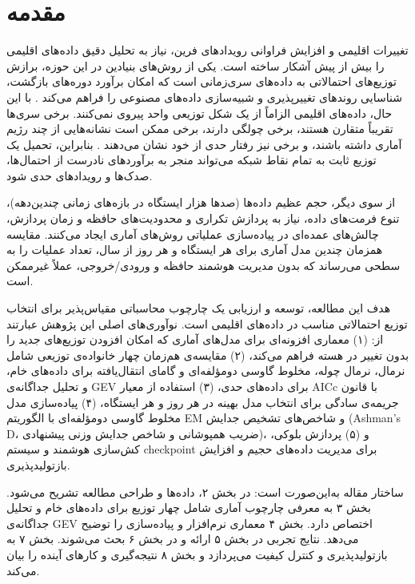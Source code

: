 \documentclass[12pt,a4paper,twocolumn]{article}
\begin{document}
\section{مقدمه}

تغییرات اقلیمی و افزایش فراوانی رویدادهای فرین، نیاز به تحلیل دقیق داده‌های اقلیمی را بیش از پیش آشکار ساخته است. یکی از روش‌های بنیادین در این حوزه، برازش توزیع‌های احتمالاتی به داده‌های سری‌زمانی است که امکان برآورد دوره‌های بازگشت، شناسایی روندهای تغییرپذیری و شبیه‌سازی داده‌های مصنوعی را فراهم می‌کند \cite{wilks2011}. با این حال، داده‌های اقلیمی الزاماً از یک شکل توزیعی واحد پیروی نمی‌کنند. برخی سری‌ها تقریباً متقارن هستند، برخی چولگی دارند، برخی ممکن است نشانه‌هایی از چند رژیم آماری داشته باشند، و برخی نیز رفتار حدی از خود نشان می‌دهند \cite{katz2002}. بنابراین، تحمیل یک توزیع ثابت به تمام نقاط شبکه می‌تواند منجر به برآوردهای نادرست از احتمال‌ها، صدک‌ها و رویدادهای حدی شود.

از سوی دیگر، حجم عظیم داده‌ها (صدها هزار ایستگاه در بازه‌های زمانی چندین‌دهه)، تنوع فرمت‌های داده، نیاز به پردازش تکراری و محدودیت‌های حافظه و زمان پردازش، چالش‌های عمده‌ای در پیاده‌سازی عملیاتی روش‌های آماری ایجاد می‌کنند. مقایسه همزمان چندین مدل آماری برای هر ایستگاه و هر روز از سال، تعداد عملیات را به سطحی می‌رساند که بدون مدیریت هوشمند حافظه و ورودی/خروجی، عملاً غیرممکن است.

هدف این مطالعه، توسعه و ارزیابی یک چارچوب محاسباتی مقیاس‌پذیر برای انتخاب توزیع احتمالاتی مناسب در داده‌های اقلیمی است. نوآوری‌های اصلی این پژوهش عبارتند از: (۱) معماری افزونه‌ای برای مدل‌های آماری که امکان افزودن توزیع‌های جدید را بدون تغییر در هسته فراهم می‌کند، (۲) مقایسه‌ی هم‌زمان چهار خانواده‌ی توزیعی شامل نرمال، نرمال چوله، مخلوط گاوسی دومؤلفه‌ای و گامای انتقال‌یافته برای داده‌های خام، و تحلیل جداگانه‌ی GEV برای داده‌های حدی، (۳) استفاده از معیار AICc با قانون جریمه‌ی سادگی برای انتخاب مدل بهینه در هر روز و هر ایستگاه، (۴) پیاده‌سازی مدل مخلوط گاوسی دومؤلفه‌ای با الگوریتم EM و شاخص‌های تشخیص جدایش (Ashman's D، ضریب همپوشانی و شاخص جدایش وزنی پیشنهادی)، و (۵) پردازش بلوکی، کش‌سازی هوشمند و سیستم checkpoint برای مدیریت داده‌های حجیم و افزایش بازتولیدپذیری.

ساختار مقاله به‌این‌صورت است: در بخش ۲، داده‌ها و طراحی مطالعه تشریح می‌شود. بخش ۳ به معرفی چارچوب آماری شامل چهار توزیع برای داده‌های خام و تحلیل جداگانه‌ی GEV اختصاص دارد. بخش ۴ معماری نرم‌افزار و پیاده‌سازی را توضیح می‌دهد. نتایج تجربی در بخش ۵ ارائه و در بخش ۶ بحث می‌شوند. بخش ۷ به بازتولیدپذیری و کنترل کیفیت می‌پردازد و بخش ۸ نتیجه‌گیری و کارهای آینده را بیان می‌کند.
\end{document}
